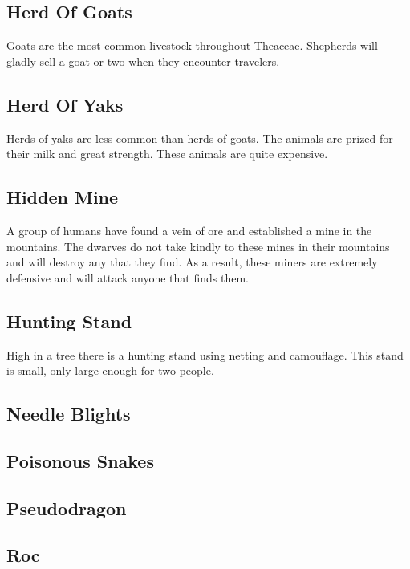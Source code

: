 \subsection{Herd Of Goats}

Goats are the most common livestock throughout Theaceae.
Shepherds will gladly sell a goat or two when they encounter travelers.

\subsection{Herd Of Yaks}

Herds of yaks are less common than herds of goats.
The animals are prized for their milk and great strength.
These animals are quite expensive.

\subsection{Hidden Mine}

A group of humans have found a vein of ore and established a mine in the mountains.
The dwarves do not take kindly to these mines in their mountains and will destroy any that they find.
As a result, these miners are extremely defensive and will attack anyone that finds them.

\subsection{Hunting Stand}

High in a tree there is a hunting stand using netting and camouflage.
This stand is small, only large enough for two people.

\subsection{Needle Blights}

\subsection{Poisonous Snakes}

\subsection{Pseudodragon}

\subsection{Roc}

